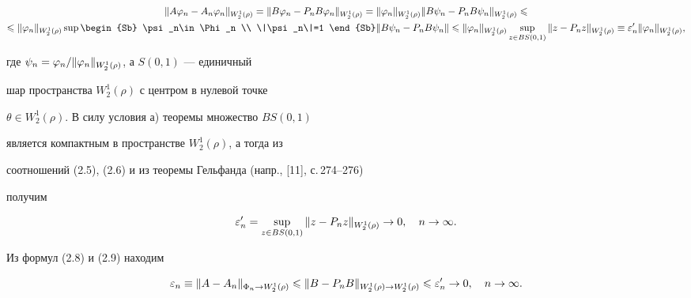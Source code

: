 \begin{gather}


\|A\vp_n - A_n\vp_n\|_{W_2^1(\rho)} = \|B\vp_n -


P_nB\vp_n\|_{W_2^1(\rho)} = \|\vp_n\|_{W_2^1(\rho)}


\|B\psi_n - P_nB\psi_n\|_{W_2^1(\rho)}\lea\notag\\


%


\lea \|\vp_n\|_{W_2^1(\rho)}


\sup\limits \begin{Sb} \psi_n\in \Phi_n \\ \|\psi_n\|=1 \end{Sb}


\|B\psi_n - P_nB\psi_n\|\lea\|\vp_n\|_{W_2^1(\rho)}


\sup\limits_{z\in BS(0,1)}\|z - P_nz\|_{W_2^1(\rho)}


\equiv \ve_n'\|\vp_n\|_{W_2^1(\rho)},


\end{gather}


где $\psi_n = \varphi_n/\|\varphi_n\|_{W_2^1(\rho)}$, а $S(0,1)$ --- единичный 


шар пространства $W_2^1(\rho)$ с центром в нулевой точке


$\theta\in W_2^1(\rho)$. В силу условия а) теоремы множество $BS(0,1)$ 


является компактным в пространстве $W_2^1(\rho)$, а тогда из 


соотношений (2.5), (2.6) и из теоремы Гельфанда (напр., [11], с.\,274--276)


получим


\begin{equation}


\ve_n' = \sup\limits_{z\in BS(0,1)}\|z-P_nz\|_{W_2^1(\rho)}\to 0,


\quad n\to   \infty.


\end{equation}





Из формул (2.8) и (2.9) находим 


\begin{equation}


\ve_n\equiv \|A-A_n\|_{\Phi_n\to W_2^1(\rho)}\lea


\|B - P_nB\|_{W_2^1(\rho)\to W_2^1(\rho)}\lea \ve_n'\to 0,


\quad n\to \infty.


\end{equation}





